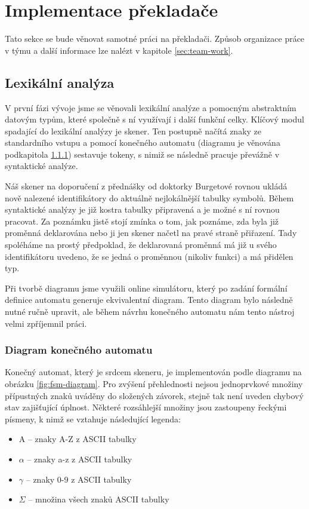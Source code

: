 \documentclass[11pt,a4paper]{article}
\newcommand\Alpha{\mathrm{A}} %
\begin{document}
\section{Implementace překladače}

Tato sekce se bude věnovat samotné práci na překladači. Způsob organizace práce v týmu a další informace lze nalézt v kapitole \ref{sec:team-work}.

    \subsection{Lexikální analýza}
    V první fázi vývoje jsme se věnovali lexikální analýze a pomocným abstraktním datovým typům, které společně s ní využívají i další funkční celky. Klíčový modul spadající do lexikální analýzy je skener. Ten postupně načítá znaky ze standardního vstupu a pomocí konečného automatu (diagramu je věnována podkapitola \ref{sec:fsm-diagram}) sestavuje tokeny, s nimiž se následně pracuje převážně v syntaktické analýze.
    
    Náš skener na doporučení z přednášky od doktorky Burgetové rovnou ukládá nově nalezené identifikátory do aktuálně nejlokálnější tabulky symbolů. Během syntaktické analýzy je již kostra tabulky připravená a je možné s ní rovnou pracovat. Za poznámku jistě stojí zmínka o tom, jak poznáme, zda byla již proměnná deklarována nebo ji jen skener načetl na pravé straně přiřazení. Tady spoléháme na prostý předpoklad, že deklarovaná proměnná má již u svého identifikátoru uvedeno, že se jedná o proměnnou (nikoliv funkci) a má přidělen typ.
    
    Při tvorbě diagramu jsme využili online simulátoru\cite{fsm-simulator}, který po zadání formální definice automatu generuje ekvivalentní diagram. Tento diagram bylo následně nutné ručně upravit, ale během návrhu konečného automatu nám tento nástroj velmi zpříjemnil práci.
    
        \subsubsection{Diagram konečného automatu}
        \label{sec:fsm-diagram}
        Konečný automat, který je srdcem skeneru, je implementován podle diagramu na obrázku \ref{fig:fsm-diagram}. Pro zvýšení přehlednosti nejsou jednoprvkové množiny přípustných znaků uváděny do složených závorek, stejně tak není uveden chybový stav zajišťující úplnost. Některé rozsáhlejší množiny jsou zastoupeny řeckými písmeny, k nimž se vztahuje následující legenda:
        \begin{itemize}
            \item $\Alpha$ -- znaky A-Z z ASCII tabulky
            \item $\alpha$ -- znaky a-z z ASCII tabulky
            \item $\gamma$ -- znaky 0-9 z ASCII tabulky
            \item $\Sigma$ -- množina všech znaků ASCII tabulky
        \end{itemize}
    
\end{document}

